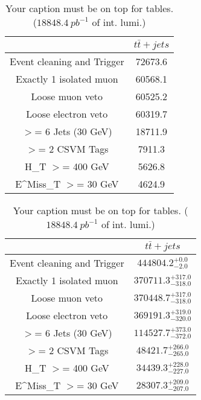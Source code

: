 \documentclass{article}
\begin{document}
\begin{table}
\caption{Your caption must be on top for tables. ($18848.4~pb^{-1}$ of int. lumi.)}
\label{tab:}
\centering
\begin{tabular}{|c|c|}
\toprule
&$t\bar{t}+jets$	\\

\midrule
Event cleaning and Trigger&	72673.6	\\

Exactly 1 isolated muon&	60568.1	\\

Loose muon veto&	60525.2	\\

Loose electron veto&	60319.7	\\

$>$= 6 Jets (30 GeV)&	18711.9	\\

$>$= 2 CSVM Tags&	7911.3	\\

H_{T} $>$=  400 GeV&	5626.8	\\

E^{Miss}_{T} $>$=  30 GeV&	4624.9	\\

\bottomrule
\end{tabular}
\end{table}
\begin{table}
\caption{Your caption must be on top for tables. ($18848.4~pb^{-1}$ of int. lumi.)}
\label{tab:}
\centering
\begin{tabular}{|c|c|}
\toprule
&$t\bar{t}+jets$	\\

\midrule
Event cleaning and Trigger&	$444804.2^{+0.0}_{-2.0}$	\\

Exactly 1 isolated muon&	$370711.3^{+317.0}_{-318.0}$	\\

Loose muon veto&	$370448.7^{+317.0}_{-318.0}$	\\

Loose electron veto&	$369191.3^{+319.0}_{-320.0}$	\\

$>$= 6 Jets (30 GeV)&	$114527.7^{+373.0}_{-372.0}$	\\

$>$= 2 CSVM Tags&	$48421.7^{+266.0}_{-265.0}$	\\

H_{T} $>$=  400 GeV&	$34439.3^{+228.0}_{-227.0}$	\\

E^{Miss}_{T} $>$=  30 GeV&	$28307.3^{+209.0}_{-207.0}$	\\

\bottomrule
\end{tabular}
\end{table}
\end{document}
